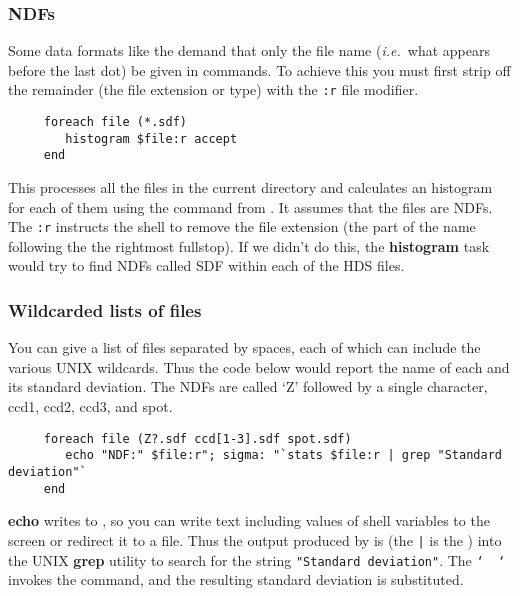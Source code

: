 \subsubsection{NDFs\label{sc4_se_series_ndfs}}

Some data formats like the  demand that only the file
name ({\em i.e.}\ what appears before the last dot) be given in
commands.  To achieve this you must first strip off the remainder (the
file extension or type) with the {\tt :r} {\sf file modifier}.

\small
\begin{verbatim}
     foreach file (*.sdf)
        histogram $file:r accept
     end
\end{verbatim}
\normalsize

This processes all the {\sf \HDSref} files in the current directory
and calculates an histogram for each of them using the
 command from \KAPPAref\@.  It
assumes that the files are NDFs.  The {\tt :r}
instructs the shell to remove the file extension (the part of the name
following the the rightmost fullstop).  If we didn't do this, the {\bf
histogram} task would try to find NDFs called SDF within each of the
HDS files.

\subsubsection{Wildcarded lists of files
\label{sc4_se_wildcard_lists}}

You can give a list of files separated by spaces, each of which
can include the various UNIX wildcards.  Thus the code below
would report the name of each  and its standard deviation.
The NDFs are called `Z' followed by a single character, ccd1,
ccd2, ccd3, and spot.

\small
\begin{verbatim}
     foreach file (Z?.sdf ccd[1-3].sdf spot.sdf)
        echo "NDF:" $file:r"; sigma: "`stats $file:r | grep "Standard deviation"`
     end
\end{verbatim}
\normalsize

{\bf echo} writes to , so
you can write text including values of shell variables to the screen
or redirect it to a file.  Thus the output produced by 
 is 
(the {\tt |} is the ) into the UNIX
{\bf grep} utility to search for the string {\tt "Standard
deviation"}.  The {\tt `~~`} invokes the command, and the resulting
standard deviation is substituted.
\medskip

